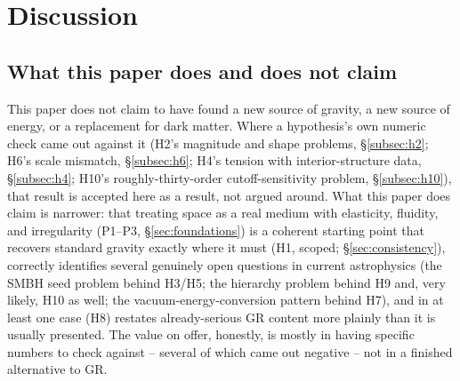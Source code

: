 \documentclass[12pt, a4paper]{article}
\begin{document}
\section{Discussion}
\label{sec:discussion}
\subsection{What this paper does and does not claim}
This paper does not claim to have found a new source of gravity, a
new source of energy, or a replacement for dark matter. Where a
hypothesis's own numeric check came out against it (H2's magnitude
and shape problems, \S\ref{subsec:h2}; H6's scale mismatch,
\S\ref{subsec:h6}; H4's tension with interior-structure data,
\S\ref{subsec:h4}; H10's roughly-thirty-order cutoff-sensitivity
problem, \S\ref{subsec:h10}), that result is accepted here as a
result, not argued around. What this paper does claim is narrower:
that treating space as a real medium with elasticity, fluidity, and
irregularity (P1--P3, \S\ref{sec:foundations}) is a coherent starting
point that recovers standard gravity exactly where it must (H1,
scoped; \S\ref{sec:consistency}), correctly identifies several
genuinely open questions in current astrophysics (the SMBH seed
problem behind H3/H5; the hierarchy problem behind H9 and, very
likely, H10 as well; the vacuum-energy-conversion pattern behind H7),
and in at least one case (H8) restates already-serious GR content
more plainly than it is usually presented. The value on offer,
honestly, is mostly in having specific numbers to check against --
several of which came out negative -- not in a finished alternative
to GR.
\end{document}
